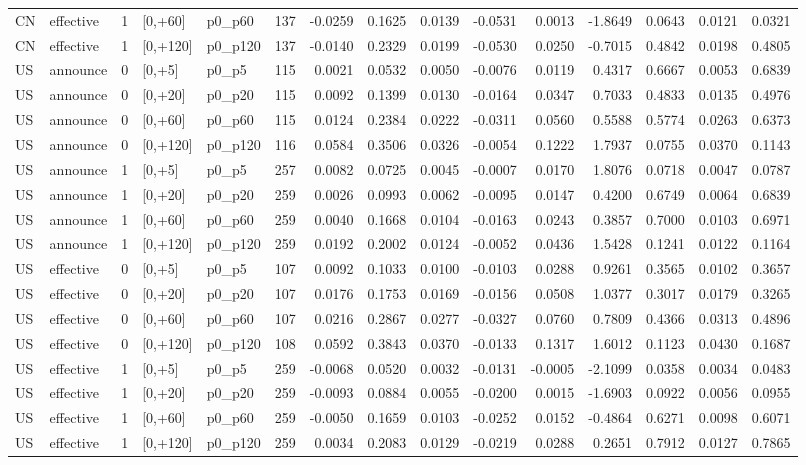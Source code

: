 \begin{tabular}{llrllrrrrrrrrrr}
CN & effective & 1 & [0,+60] & p0_p60 & 137 & -0.0259 & 0.1625 & 0.0139 & -0.0531 & 0.0013 & -1.8649 & 0.0643 & 0.0121 & 0.0321 \\
CN & effective & 1 & [0,+120] & p0_p120 & 137 & -0.0140 & 0.2329 & 0.0199 & -0.0530 & 0.0250 & -0.7015 & 0.4842 & 0.0198 & 0.4805 \\
US & announce & 0 & [0,+5] & p0_p5 & 115 & 0.0021 & 0.0532 & 0.0050 & -0.0076 & 0.0119 & 0.4317 & 0.6667 & 0.0053 & 0.6839 \\
US & announce & 0 & [0,+20] & p0_p20 & 115 & 0.0092 & 0.1399 & 0.0130 & -0.0164 & 0.0347 & 0.7033 & 0.4833 & 0.0135 & 0.4976 \\
US & announce & 0 & [0,+60] & p0_p60 & 115 & 0.0124 & 0.2384 & 0.0222 & -0.0311 & 0.0560 & 0.5588 & 0.5774 & 0.0263 & 0.6373 \\
US & announce & 0 & [0,+120] & p0_p120 & 116 & 0.0584 & 0.3506 & 0.0326 & -0.0054 & 0.1222 & 1.7937 & 0.0755 & 0.0370 & 0.1143 \\
US & announce & 1 & [0,+5] & p0_p5 & 257 & 0.0082 & 0.0725 & 0.0045 & -0.0007 & 0.0170 & 1.8076 & 0.0718 & 0.0047 & 0.0787 \\
US & announce & 1 & [0,+20] & p0_p20 & 259 & 0.0026 & 0.0993 & 0.0062 & -0.0095 & 0.0147 & 0.4200 & 0.6749 & 0.0064 & 0.6839 \\
US & announce & 1 & [0,+60] & p0_p60 & 259 & 0.0040 & 0.1668 & 0.0104 & -0.0163 & 0.0243 & 0.3857 & 0.7000 & 0.0103 & 0.6971 \\
US & announce & 1 & [0,+120] & p0_p120 & 259 & 0.0192 & 0.2002 & 0.0124 & -0.0052 & 0.0436 & 1.5428 & 0.1241 & 0.0122 & 0.1164 \\
US & effective & 0 & [0,+5] & p0_p5 & 107 & 0.0092 & 0.1033 & 0.0100 & -0.0103 & 0.0288 & 0.9261 & 0.3565 & 0.0102 & 0.3657 \\
US & effective & 0 & [0,+20] & p0_p20 & 107 & 0.0176 & 0.1753 & 0.0169 & -0.0156 & 0.0508 & 1.0377 & 0.3017 & 0.0179 & 0.3265 \\
US & effective & 0 & [0,+60] & p0_p60 & 107 & 0.0216 & 0.2867 & 0.0277 & -0.0327 & 0.0760 & 0.7809 & 0.4366 & 0.0313 & 0.4896 \\
US & effective & 0 & [0,+120] & p0_p120 & 108 & 0.0592 & 0.3843 & 0.0370 & -0.0133 & 0.1317 & 1.6012 & 0.1123 & 0.0430 & 0.1687 \\
US & effective & 1 & [0,+5] & p0_p5 & 259 & -0.0068 & 0.0520 & 0.0032 & -0.0131 & -0.0005 & -2.1099 & 0.0358 & 0.0034 & 0.0483 \\
US & effective & 1 & [0,+20] & p0_p20 & 259 & -0.0093 & 0.0884 & 0.0055 & -0.0200 & 0.0015 & -1.6903 & 0.0922 & 0.0056 & 0.0955 \\
US & effective & 1 & [0,+60] & p0_p60 & 259 & -0.0050 & 0.1659 & 0.0103 & -0.0252 & 0.0152 & -0.4864 & 0.6271 & 0.0098 & 0.6071 \\
US & effective & 1 & [0,+120] & p0_p120 & 259 & 0.0034 & 0.2083 & 0.0129 & -0.0219 & 0.0288 & 0.2651 & 0.7912 & 0.0127 & 0.7865 \\
\bottomrule
\end{tabular}
